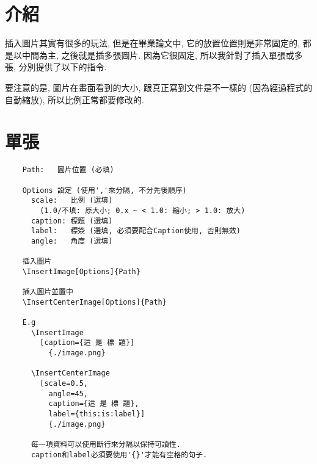 \section{介紹}

插入圖片其實有很多的玩法, 但是在畢業論文中, 它的放置位置則是非常固定的, 都是以中間為主, 之後就是插多張圖片. 因為它很固定, 所以我針對了插入單張或多張, 分別提供了以下的指令.

要注意的是, 圖片在畫面看到的大小, 跟真正寫到文件是不一樣的 (因為經過程式的自動縮放), 所以比例正常都要修改的.


\newpage
\section{單張}

  \begin{framed}
  \begin{verbatim}
    Path:   圖片位置 (必填)

    Options 設定 (使用','來分隔, 不分先後順序)
      scale:   比例 (選填)
        (1.0/不填: 原大小; 0.x ~ < 1.0: 縮小; > 1.0: 放大)
      caption: 標題 (選填)
      label:   標簽 (選填, 必須要配合Caption使用, 否則無效)
      angle:   角度 (選填)

    插入圖片
    \InsertImage[Options]{Path}

    插入圖片並置中
    \InsertCenterImage[Options]{Path}

    E.g
      \InsertImage
        [caption={這 是 標 題}]
          {./image.png}

      \InsertCenterImage
        [scale=0.5,
          angle=45,
          caption={這 是 標 題},
          label={this:is:label}]
          {./image.png}

      每一項資料可以使用斷行來分隔以保持可讀性.
      caption和label必須要使用'{}'才能有空格的句子.
  \end{verbatim}
  \end{framed}

  \newpage

